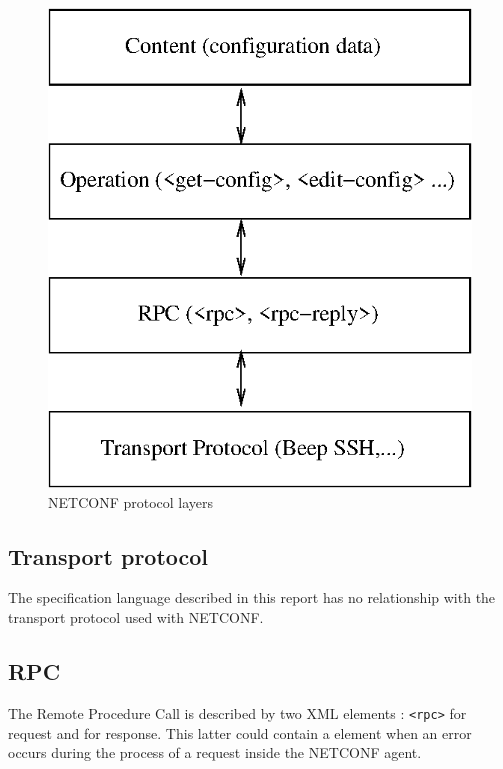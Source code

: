 \documentclass[a4paper]{article}
\begin{document}
\begin{figure}[htbp]
\begin{center}
\includegraphics[scale = .7]{netconfarchi.eps}
\end{center}
\caption{NETCONF protocol layers}
\label{netconfarchi}
\end{figure}

\subsection{Transport protocol}

The   specification  language   described  in   this  report   has  no
relationship with the transport protocol used with NETCONF.

\subsection{RPC}

The Remote  Procedure Call  is described by  two XML\cite{Bray:00:EML}
elements  :  {\tt  <rpc>}   for  request  and  {\tt  <rpc-reply>}  for
response. This  latter could contain a {\tt  <rpc-error>} element when
an error  occurs during  the process of  a request inside  the NETCONF
agent.
\end{document}

